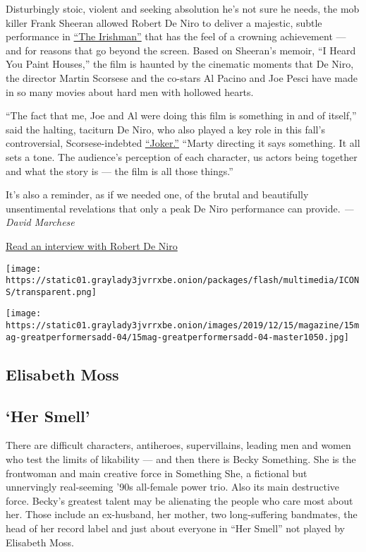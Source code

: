 Disturbingly stoic, violent and seeking absolution he's not sure he
needs, the mob killer Frank Sheeran allowed Robert De Niro to deliver a
majestic, subtle performance in
\href{https://www.nytimes3xbfgragh.onion/2019/09/27/movies/the-irishman-review.html}{``The
Irishman''} that has the feel of a crowning achievement --- and for
reasons that go beyond the screen. Based on Sheeran's memoir, ``I Heard
You Paint Houses,'' the film is haunted by the cinematic moments that De
Niro, the director Martin Scorsese and the co-stars Al Pacino and Joe
Pesci have made in so many movies about hard men with hollowed hearts.

``The fact that me, Joe and Al were doing this film is something in and
of itself,'' said the halting, taciturn De Niro, who also played a key
role in this fall's controversial, Scorsese-indebted
\href{https://www.nytimes3xbfgragh.onion/2019/10/03/movies/joker-review.html}{``Joker.''}
``Marty directing it says something. It all sets a tone. The audience's
perception of each character, us actors being together and what the
story is --- the film is all those things.''

It's also a reminder, as if we needed one, of the brutal and beautifully
unsentimental revelations that only a peak De Niro performance can
provide. \emph{--- David Marchese}

\href{https://www.nytimes3xbfgragh.onion/interactive/2019/12/09/magazine/robert-deniro-interview.html}{Read
an interview with Robert De Niro}

\texttt{[image: https://static01.graylady3jvrrxbe.onion/packages/flash/multimedia/ICONS/transparent.png]}

\texttt{[image: https://static01.graylady3jvrrxbe.onion/images/2019/12/15/magazine/15mag-greatperformersadd-04/15mag-greatperformersadd-04-master1050.jpg]}

\hypertarget{elisabeth-moss}{%
\subsection{Elisabeth Moss}\label{elisabeth-moss}}

\hypertarget{her-smell}{%
\subsection{`Her Smell'}\label{her-smell}}

There are difficult characters, antiheroes, supervillains, leading men
and women who test the limits of likability --- and then there is Becky
Something. She is the frontwoman and main creative force in Something
She, a fictional but unnervingly real-seeming '90s all-female power
trio. Also its main destructive force. Becky's greatest talent may be
alienating the people who care most about her. Those include an
ex-husband, her mother, two long-suffering bandmates, the head of her
record label and just about everyone in ``Her Smell'' not played by
Elisabeth Moss.

